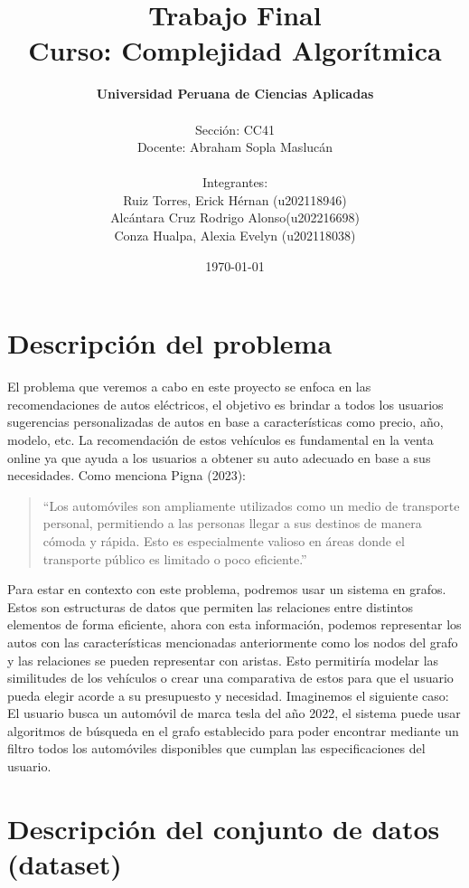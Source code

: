 \documentclass[12pt]{article}
\title{\textbf{Trabajo Final} \\ Curso: Complejidad Algorítmica}
\author{
  \textbf{Universidad Peruana de Ciencias Aplicadas}\\\\
  Sección: CC41\\
  Docente: Abraham Sopla Maslucán\\\\
  Integrantes:\\
  Ruiz Torres, Erick Hérnan (u202118946)\\
  Alcántara Cruz Rodrigo Alonso(u202216698)\\
  Conza Hualpa, Alexia Evelyn (u202118038)
}
\date{\myformat\today}
\begin{document}
\maketitle
\newpage
\tableofcontents
\newpage

\section{Descripción del problema}
El problema que veremos a cabo en este proyecto se enfoca en las recomendaciones de autos eléctricos, el objetivo es brindar a todos los usuarios sugerencias personalizadas de autos en base a características como precio, año, modelo, etc. La recomendación de estos vehículos es fundamental en la venta online ya que ayuda a los usuarios a obtener su auto adecuado en base a sus necesidades. Como menciona Pigna (2023):

\begin{quote}
“Los automóviles son ampliamente utilizados como un medio de transporte personal, permitiendo a las personas llegar a sus destinos de manera cómoda y rápida. Esto es especialmente valioso en áreas donde el transporte público es limitado o poco eficiente.”
\end{quote}

Para estar en contexto con este problema, podremos usar un sistema en grafos. Estos son estructuras de datos que permiten las relaciones entre distintos elementos de forma eficiente, ahora con esta información, podemos representar los autos con las características mencionadas anteriormente como los nodos del grafo y las relaciones se pueden representar con aristas. Esto permitiría modelar las similitudes de los vehículos o crear una comparativa de estos para que el usuario pueda elegir acorde a su presupuesto y necesidad. Imaginemos el siguiente caso: El usuario busca un automóvil de marca tesla del año 2022, el sistema puede usar algoritmos de búsqueda en el grafo establecido para poder encontrar mediante un filtro todos los automóviles disponibles que cumplan las especificaciones del usuario.


\section{Descripción del conjunto de datos (dataset)}
\end{document}
